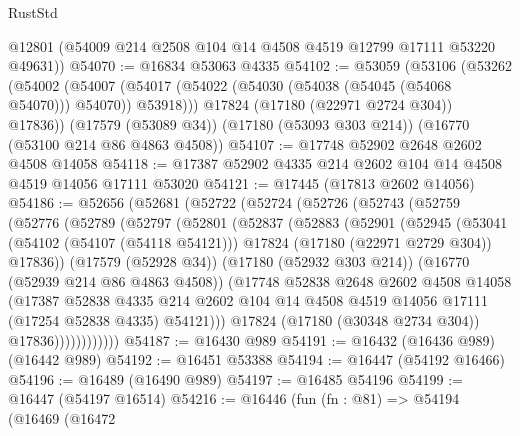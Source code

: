 \begin{lexlean}{RustStd}
\begin{coremodule}
{\begin{coremodule}
{{{{{{{{{{{{{{{{{{{{{{{{{{{{{{{{{{{{{{{{{{{{{{{{{{{{{{{      @12801
      (@54009 @214 @2508 @104 @14 @4508 @4519 @12799 @17111 @53220 @49631))
@54070 := @16834 @53063 @4335
@54102 := @53059
    (@53106
      (@53262
        (@54002 (@54007 (@54017 (@54022 (@54030 (@54038 (@54045 (@54068 @54070))) @54070)) @53918)))
        @17824
        (@17180 (@22971 @2724 @304))
        @17836))
    (@17579 (@53089 @34))
    (@17180 (@53093 @303 @214))
    (@16770 (@53100 @214 @86 @4863 @4508))
@54107 := @17748 @52902 @2648 @2602 @4508 @14058
@54118 := @17387 @52902 @4335 @214 @2602 @104 @14 @4508 @4519 @14056 @17111 @53020
@54121 := @17445 (@17813 @2602 @14056)
@54186 := @52656
    (@52681
      (@52722
        (@52724
          (@52726
            (@52743
              (@52759
                (@52776
                  (@52789
                    (@52797
                      (@52801
                        (@52837
                          (@52883
                            (@52901
                              (@52945
                                (@53041
                                  (@54102 (@54107 (@54118 @54121)))
                                  @17824
                                  (@17180 (@22971 @2729 @304))
                                  @17836))
                              (@17579 (@52928 @34))
                              (@17180 (@52932 @303 @214))
                              (@16770 (@52939 @214 @86 @4863 @4508))
                              (@17748
                                @52838
                                @2648
                                @2602
                                @4508
                                @14058
                                (@17387
                                  @52838
                                  @4335
                                  @214
                                  @2602
                                  @104
                                  @14
                                  @4508
                                  @4519
                                  @14056
                                  @17111
                                  (@17254 @52838 @4335)
                                  @54121)))
                            @17824
                            (@17180 (@30348 @2734 @304))
                            @17836))))))))))))
@54187 := @16430 @989
@54191 := @16432 (@16436 @989) (@16442 @989)
@54192 := @16451 @53388
@54194 := @16447 (@54192 @16466)
@54196 := @16489 (@16490 @989)
@54197 := @16485 @54196
@54199 := @16447 (@54197 @16514)
@54216 := @16446
    (fun (fn : @81) =>
    @54194
      (@16469
        (@16472
}}}}}}}}}}}}}}}}}}}}}}}}}}}}}}}}}}}}}}}}}}}}}}}}}}}}}}}
\end{coremodule}}
\end{coremodule}
\end{lexlean}

